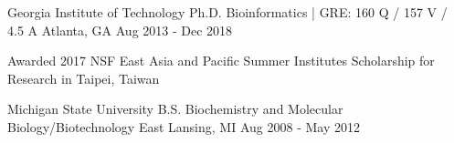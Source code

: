 \vspace{1.0mm}

\begin{cventries}

  \cventry
  	{Georgia Institute of Technology} %
    {Ph.D. Bioinformatics \scriptsize{} | {GRE: 160 Q / 157 V / 4.5 A}} %
    {Atlanta, GA} %
    {Aug 2013 - Dec 2018} %
    {\begin{cvitems}
    \item \scriptsize{Awarded 2017 NSF East Asia and Pacific Summer Institutes Scholarship for Research in Taipei, Taiwan}
    \end{cvitems}
    }


  \cventry
  	{Michigan State University} %
    {B.S. Biochemistry and Molecular Biology/Biotechnology \scriptsize{}} %
    {East Lansing, MI} %
    {Aug 2008 - May 2012} %
    {}
	
\vspace{-2em}

\end{cventries}
